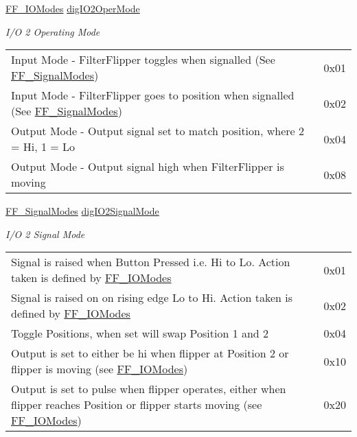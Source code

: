 \begin{DoxyCompactItemize}
\hyperlink{group___filter_flipper_ga3f9223ae197e5703d709034a238d3925}{F\+F\+\_\+\+I\+O\+Modes} \hyperlink{struct_f_f___i_o_settings_a10426ee21802861d3ee91ee752d98eb8}{dig\+I\+O2\+Oper\+Mode}
\begin{DoxyCompactList}\small\item\em I/O 2 Operating Mode \tabulinesep=1mm
\begin{longtabu} spread 0pt [c]{*2{|X[-1]}|}
\hline
Input Mode -\/ Filter\+Flipper toggles when signalled (See \hyperlink{group___filter_flipper_ga0049497885ad3480ad2ccbb1d354809a}{F\+F\+\_\+\+Signal\+Modes})&0x01 \\
Input Mode -\/ Filter\+Flipper goes to position when signalled (See \hyperlink{group___filter_flipper_ga0049497885ad3480ad2ccbb1d354809a}{F\+F\+\_\+\+Signal\+Modes})&0x02 \\
Output Mode -\/ Output signal set to match position, where 2 = Hi, 1 = Lo&0x04 \\
Output Mode -\/ Output signal high when Filter\+Flipper is moving&0x08 \\
\end{longtabu}
\end{DoxyCompactList}\item 
\hyperlink{group___filter_flipper_ga0049497885ad3480ad2ccbb1d354809a}{F\+F\+\_\+\+Signal\+Modes} \hyperlink{struct_f_f___i_o_settings_aa26b1d2f4827908e66271ef41e462452}{dig\+I\+O2\+Signal\+Mode}
\begin{DoxyCompactList}\small\item\em I/O 2 Signal Mode \tabulinesep=1mm
\begin{longtabu} spread 0pt [c]{*2{|X[-1]}|}
\hline
Signal is raised when Button Pressed i.\+e. Hi to Lo. Action taken is defined by \hyperlink{group___filter_flipper_ga3f9223ae197e5703d709034a238d3925}{F\+F\+\_\+\+I\+O\+Modes}&0x01 \\
Signal is raised on on rising edge Lo to Hi. Action taken is defined by \hyperlink{group___filter_flipper_ga3f9223ae197e5703d709034a238d3925}{F\+F\+\_\+\+I\+O\+Modes}&0x02 \\
Toggle Positions, when set will swap Position 1 and 2&0x04 \\
Output is set to either be hi when flipper at Position 2 or flipper is moving (see \hyperlink{group___filter_flipper_ga3f9223ae197e5703d709034a238d3925}{F\+F\+\_\+\+I\+O\+Modes})&0x10 \\
Output is set to pulse when flipper operates, either when flipper reaches Position or flipper starts moving (see \hyperlink{group___filter_flipper_ga3f9223ae197e5703d709034a238d3925}{F\+F\+\_\+\+I\+O\+Modes})&0x20 \\

\end{longtabu}
\end{DoxyCompactList}
\end{DoxyCompactItemize}
